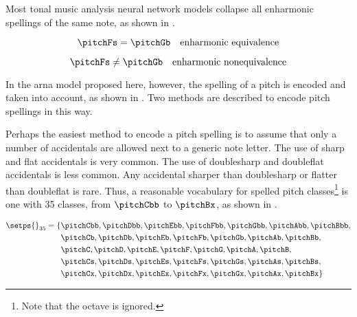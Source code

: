 
Most tonal music analysis neural network models collapse all
enharmonic spellings of the same note, as shown in
.

\begin{equation}
    \label{eq:enharmonic_equivalence}
    \pitchFs = \pitchGb \quad \text{enharmonic equivalence}
\end{equation}

\begin{equation}
    \label{eq:enharmonic_nonequivalence}
    \pitchFs \neq \pitchGb \quad \text{enharmonic nonequivalence}
\end{equation}

In the \gls{arna} model proposed here, however, the spelling
of a pitch is encoded and taken into account, as shown in
. Two methods are described
to encode pitch spellings in this way.



Perhaps the easiest method to encode a pitch spelling is to
assume that only a number of accidentals are allowed next to
a generic note letter. The use of \gls{sharp} and \gls{flat}
accidentals is very common. The use of \gls{doublesharp} and
\gls{doubleflat} accidentals is less common. Any accidental
sharper than \gls{doublesharp} or flatter than
\gls{doubleflat} is rare. Thus, a reasonable vocabulary for
spelled pitch classes\footnote{Note that the octave is
ignored.} is one with 35 classes, from $\pitchCbb$ to
$\pitchBx$, as shown in .

\begin{equation}
    \label{eq:pitch_spelling_35}
    \begin{split}
    \setps{}_{35} = \{ & \pitchCbb, \pitchDbb, \pitchEbb, \pitchFbb, \pitchGbb, \pitchAbb, \pitchBbb, \\
    & \pitchCb, \pitchDb, \pitchEb, \pitchFb, \pitchGb, \pitchAb, \pitchBb, \\
    & \pitchC, \pitchD, \pitchE, \pitchF, \pitchG, \pitchA, \pitchB, \\
    & \pitchCs, \pitchDs, \pitchEs, \pitchFs, \pitchGs, \pitchAs, \pitchBs, \\
    & \pitchCx, \pitchDx, \pitchEx, \pitchFx, \pitchGx, \pitchAx, \pitchBx \}
    \end{split}
\end{equation}

